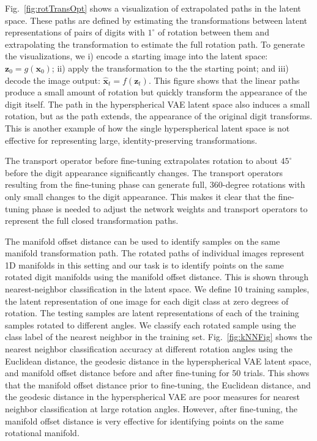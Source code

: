 \documentclass[letterpaper]{article} %
\newcommand{\vtr}[1]{\ensuremath{\mathbf{#1}}}
\begin{document}
Fig.~\ref{fig:rotTransOpt} shows a visualization of extrapolated paths in the latent space. These paths are defined by estimating the transformations between latent representations of pairs of digits with $1^{\circ}$ of rotation between them and extrapolating the transformation to estimate the full rotation path. To generate the visualizations, we i) encode a starting image into the latent space: $\vtr{z}_0 = g(\vtr{x}_0)$; ii) apply the transformation to the the starting point; and iii) decode the image output: $\hat{\vtr{x}}_t = f(\vtr{z}_t)$. This figure shows that the linear paths produce a small amount of rotation but quickly transform the appearance of the digit itself. The path in the hyperspherical VAE latent space also induces a small rotation, but as the path extends, the appearance of the original digit transforms. This is another example of how the single hyperspherical latent space is not effective for representing large, identity-preserving transformations.

The transport operator before fine-tuning extrapolates rotation to about $45^{\circ}$ before the digit appearance significantly changes. The transport operators resulting from the fine-tuning phase can generate full, 360-degree rotations with only small changes to the digit appearance. This makes it clear that the fine-tuning phase is needed to adjust the network weights and transport operators to represent the full closed transformation paths.

The manifold offset distance can be used to identify samples on the same manifold transformation path. The rotated paths of individual images represent 1D manifolds in this setting and our task is to identify points on the same rotated digit manifolds using the manifold offset distance. This is shown through nearest-neighbor classification in the latent space. We define 10 training samples, the latent representation of one image for each digit class at zero degrees of rotation. The testing samples are latent representations of each of the training samples rotated to different angles. We classify each rotated sample using the class label of the nearest neighbor in the training set. Fig.~\ref{fig:kNNFig} shows the nearest neighbor classification accuracy at different rotation angles using the Euclidean distance, the geodesic distance in the hyperspherical VAE latent space, and manifold offset distance before and after fine-tuning for 50 trials. This shows that the manifold offset distance prior to fine-tuning, the Euclidean distance, and the geodesic distance in the hyperspherical VAE are poor measures for nearest neighbor classification at large rotation angles. However, after fine-tuning, the manifold offset distance is very effective for identifying points on the same rotational manifold.
\end{document}
